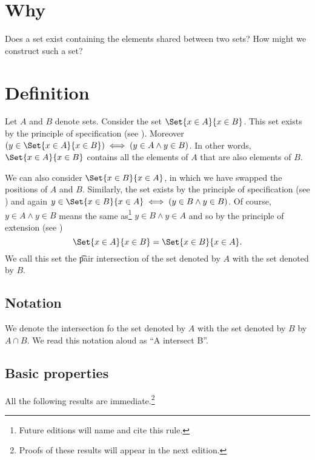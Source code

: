 

\section*{Why}

Does a set exist containing the elements shared between two sets?
How might we construct such a set?

\section*{Definition}

Let $A$ and $B$ denote sets.
Consider the set $\Set{x \in A}{x \in B}$.
This set exists by the principle of specification (see ).
Moreover $(y \in \Set{x \in A}{x \in B}) \iff (y \in A \land y \in B)$.
In other words, $\Set{x \in A}{x \in B}$ contains all the elements of $A$ that are also elements of $B$.

We can also consider $\Set{x \in B}{x \in A}$, in which we have swapped the positions of $A$ and $B$.
Similarly, the set exists by the principle of specification (see ) and again $y \in \Set{x \in B}{x \in A} \iff (y \in B \land y \in B)$.
Of course, $y \in A \land y \in B$ means the same as\footnote{Future editions will name and cite this rule.}
$y \in B \land y \in A$ and so by the principle of extension (see )
\[
\Set{x \in A}{x \in B} = \Set{x \in B}{x \in A}.
\]
We call this set the \t{pair intersection} of the set denoted by $A$ with the set denoted by $B$.

\subsection*{Notation}

We denote the intersection fo the set denoted by $A$ with the set denoted by $B$ by $A \cap  B$.
We read this notation aloud as ``A intersect B''.

\subsection*{Basic properties}

All the following results are immediate.\footnote{Proofs of these results will appear in the next edition.}

